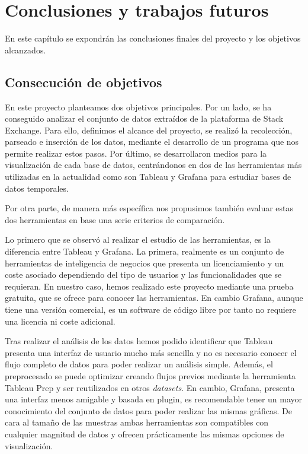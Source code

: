 \documentclass[a4paper, 12pt]{book}
\begin{document}
\cleardoublepage



\chapter{Conclusiones y trabajos futuros}
\label{chap:conclusiones}
En este capítulo se expondrán las conclusiones finales del proyecto y los objetivos alcanzados.

\section{Consecución de objetivos}
\label{sec:consecucion-objetivos}

En este proyecto planteamos dos objetivos principales. Por un lado, se ha conseguido analizar el conjunto de datos extraídos de la plataforma de Stack Exchange. Para ello, definimos el alcance del proyecto, se realizó la recolección, parseado e inserción de los datos, mediante el desarrollo de un programa que nos permite realizar estos pasos. Por último, se desarrollaron medios para la visualización de cada base de datos, centrándonos en dos de las herramientas más utilizadas en la actualidad como son Tableau y Grafana para estudiar bases de datos temporales. 

Por otra parte, de manera más específica nos propusimos también evaluar estas dos herramientas en base una serie criterios de comparación. 

Lo primero que se observó al realizar el estudio de las herramientas, es la diferencia entre Tableau y Grafana. La primera, realmente es un conjunto de herramientas de inteligencia de negocios que presenta un licenciamiento y un coste asociado dependiendo del tipo de usuarios y las funcionalidades que se requieran. En nuestro caso, hemos realizado este proyecto mediante una prueba gratuita, que se ofrece para conocer las herramientas. En cambio Grafana, aunque tiene una versión comercial, es un software de código libre por tanto no requiere una licencia ni coste adicional. 

Tras realizar el análisis de los datos hemos podido identificar que Tableau presenta una interfaz de usuario mucho más sencilla y no es necesario conocer el flujo completo de datos para poder realizar un análisis simple. Además, el preprocesado se puede optimizar creando flujos previos mediante la herramienta Tableau Prep y ser reutilizados en otros \textit{datasets}. En cambio, Grafana, presenta una interfaz menos amigable y basada en \gls{plugin}, es recomendable tener un mayor conocimiento del conjunto de datos para poder realizar las mismas gráficas.
De cara al tamaño de las muestras ambas herramientas son compatibles con cualquier magnitud de datos y ofrecen prácticamente las mismas opciones de visualización. 
\end{document}
